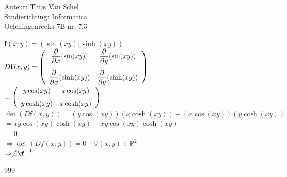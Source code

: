 \documentclass[a4paper]{article}
\begin{document}
  
\noindent \large Auteur: Thijs Van Schel \\
\noindent \large Studierichting: Informatica\\
\noindent \large Oefeningenreeks 7B nr. 7.3\\

\medskip

\normalsize

$\mathbf{f}(x,y) = (\sin(xy), \sinh(xy))$\\

$D\mathbf{f}(x,y) = \left(\begin{array}{c c} \dfrac{\partial}{\partial x}(\sin(xy)) & \dfrac{\partial}{\partial y}(\sin(xy)) \\[3ex] \dfrac{\partial}{\partial x}(\sinh(xy)) & \dfrac{\partial}{\partial y}(\sinh(xy)) \end{array}\right)$\\

$= \left(\begin{array}{c c} y\cos(xy) & x\cos(xy) \\[1.5ex] y\cosh(xy) & x\cosh(xy) \end{array}\right)$\\

$\det(D\mathbf{f}(x,y)) = (y\cos(xy))(x\cosh(xy)) - (x\cos(xy))(y\cosh(xy))$\\

$= xy\cos(xy)\cosh(xy) - xy\cos(xy)\cosh(xy)$\\

$= 0$\\

$\Rightarrow \det(Df(x,y)) = 0 \quad \forall (x,y) \in \mathbb{R}^2$\\

$\Rightarrow \not\exists \f^{-1}$\\

\begin{thebibliography}{999}
\end{thebibliography}
\end{document}
